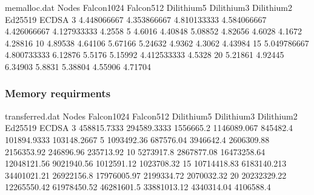 \begin{filecontents}{memalloc.dat}
Nodes	Falcon1024	Falcon512	Dilithium5	Dilithium3	Dilithium2	Ed25519	ECDSA
3	4.448066667	4.353866667	4.810133333	4.584066667	4.426066667	4.127933333	4.2558
5	4.6016	4.40848	5.08852	4.82656	4.6028	4.1672	4.28816
10	4.89538	4.64106	5.67166	5.24632	4.9362	4.3062	4.43984
15	5.049786667	4.800733333	6.12876	5.5176	5.15992	4.412533333	4.5328
20	5.21861	4.92445	6.34903	5.8831	5.38804	4.55906	4.71704
\end{filecontents}

\begin{frame}
    \frametitle{Memory requirments}
    \begin{center}
    \end{center}
\end{frame}


\begin{filecontents}{transferred.dat}
Nodes	Falcon1024	Falcon512	Dilithium5	Dilithium3	Dilithium2	Ed25519	ECDSA
3	458815.7333	294589.3333	1556665.2	1146089.067	845482.4	101894.9333	103148.2667
5	1093492.36	687576.04	3946642.4	2606309.88	2156353.92	246896.96	235713.92
10	5273917.8	2867877.08	16473258.64	12048121.56	9021940.56	1012591.12	1023708.32
15	10714418.83	6183140.213	34401021.21	26922156.8	17976005.97	2199334.72	2070032.32
20	20232329.22	12265550.42	61978450.52	46281601.5	33881013.12	4340314.04	4106588.4
\end{filecontents}

